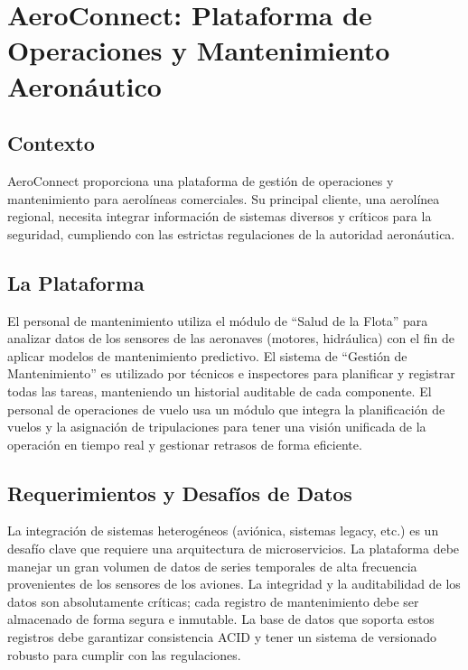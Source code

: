 \documentclass[12pt]{article}
\begin{document}
\newpage

\section{AeroConnect: Plataforma de Operaciones y Mantenimiento Aeronáutico}

\subsection{Contexto}
AeroConnect proporciona una plataforma de gestión de operaciones y mantenimiento para aerolíneas comerciales. Su principal cliente, una aerolínea regional, necesita integrar información de sistemas diversos y críticos para la seguridad, cumpliendo con las estrictas regulaciones de la autoridad aeronáutica.

\subsection{La Plataforma}
El personal de mantenimiento utiliza el módulo de ``Salud de la Flota'' para analizar datos de los sensores de las aeronaves (motores, hidráulica) con el fin de aplicar modelos de mantenimiento predictivo. El sistema de ``Gestión de Mantenimiento'' es utilizado por técnicos e inspectores para planificar y registrar todas las tareas, manteniendo un historial auditable de cada componente. El personal de operaciones de vuelo usa un módulo que integra la planificación de vuelos y la asignación de tripulaciones para tener una visión unificada de la operación en tiempo real y gestionar retrasos de forma eficiente.

\subsection{Requerimientos y Desafíos de Datos}
La integración de sistemas heterogéneos (aviónica, sistemas legacy, etc.) es un desafío clave que requiere una arquitectura de microservicios. La plataforma debe manejar un gran volumen de datos de series temporales de alta frecuencia provenientes de los sensores de los aviones. La integridad y la auditabilidad de los datos son absolutamente críticas; cada registro de mantenimiento debe ser almacenado de forma segura e inmutable. La base de datos que soporta estos registros debe garantizar consistencia ACID y tener un sistema de versionado robusto para cumplir con las regulaciones.
\end{document}
